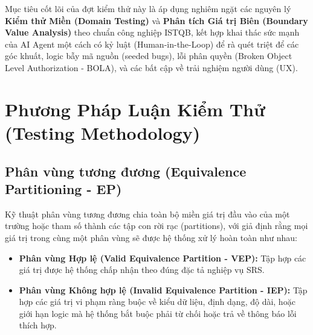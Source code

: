 \documentclass[11pt,a4paper]{article}
\begin{document}
Mục tiêu cốt lõi của đợt kiểm thử này là áp dụng nghiêm ngặt các nguyên lý \textbf{Kiểm thử Miền (Domain Testing)} và \textbf{Phân tích Giá trị Biên (Boundary Value Analysis)} theo chuẩn công nghiệp ISTQB, kết hợp khai thác sức mạnh của AI Agent một cách có kỷ luật (Human-in-the-Loop) để rà quét triệt để các góc khuất, logic bẫy mã nguồn (seeded bugs), lỗi phân quyền (Broken Object Level Authorization - BOLA), và các bất cập về trải nghiệm người dùng (UX).

\section{Phương Pháp Luận Kiểm Thử (Testing Methodology)}

\subsection{Phân vùng tương đương (Equivalence Partitioning - EP)}
Kỹ thuật phân vùng tương đương chia toàn bộ miền giá trị đầu vào của một trường hoặc tham số thành các tập con rời rạc (partitions), với giả định rằng mọi giá trị trong cùng một phân vùng sẽ được hệ thống xử lý hoàn toàn như nhau:
\begin{itemize}
    \item \textbf{Phân vùng Hợp lệ (Valid Equivalence Partition - VEP):} Tập hợp các giá trị được hệ thống chấp nhận theo đúng đặc tả nghiệp vụ SRS.
    \item \textbf{Phân vùng Không hợp lệ (Invalid Equivalence Partition - IEP):} Tập hợp các giá trị vi phạm ràng buộc về kiểu dữ liệu, định dạng, độ dài, hoặc giới hạn logic mà hệ thống bắt buộc phải từ chối hoặc trả về thông báo lỗi thích hợp.
\end{itemize}
\end{document}
